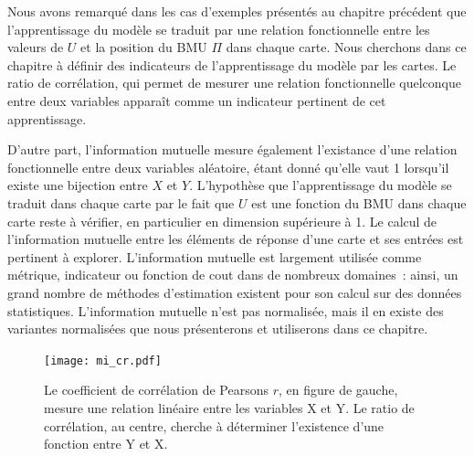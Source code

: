 \documentclass[../main]{subfiles}
\begin{document}
Nous avons remarqué dans les cas d'exemples présentés au chapitre précédent que l'apprentissage du modèle se traduit par une relation fonctionnelle entre les valeurs de $U$ et la position du BMU $\Pi$ dans chaque carte. 
Nous cherchons dans ce chapitre à définir des indicateurs de l'apprentissage du modèle par les cartes. Le ratio de corrélation, qui permet de mesurer une relation fonctionnelle quelconque entre deux variables apparaît comme un indicateur pertinent de cet apprentissage.

D'autre part, l'information mutuelle mesure également l'existance d'une relation fonctionnelle entre deux variables aléatoire, étant donné qu'elle vaut 1 lorsqu'il existe une bijection entre $X$ et $Y$. L'hypothèse que l'apprentissage du modèle se traduit dans chaque carte par le fait que $U$ est une fonction du BMU dans chaque carte reste à vérifier, en particulier en dimension supérieure à 1. Le calcul de l'information mutuelle entre les éléments de réponse d'une carte et ses entrées est pertinent à explorer. L'information mutuelle est largement utilisée comme métrique, indicateur ou fonction de cout dans de nombreux domaines~: ainsi, un grand nombre de méthodes d'estimation existent pour son calcul sur des données statistiques. L'information mutuelle n'est pas normalisée, mais il en existe des variantes normalisées que nous présenterons et utiliserons dans ce chapitre. 

\begin{figure}
    \texttt{[image: mi\_cr.pdf]}
    \caption{Le coefficient de corrélation de Pearsons $r$, en figure de gauche, mesure une relation linéaire entre les variables X et Y. Le ratio de corrélation, au centre, cherche à déterminer l'existence d'une fonction entre Y et X. \label{fig:signaux}}
\end{figure}

\end{document}
